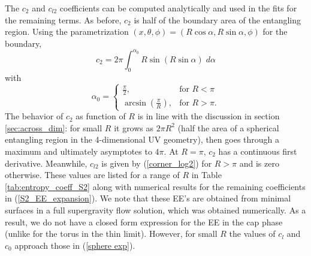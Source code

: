\documentclass[11 pt]{article}
\begin{document}
The $c_2$ and $c_{l2}$ coefficients can be computed analytically and used in the fits for the remaining terms. As before, $c_2$ is half of the boundary area of the entangling region. Using the parametrization $(x,\theta,\phi) = (R\cos{\alpha}, R\sin{\alpha},\phi)$ for the boundary,
\begin{equation}
    c_2 = 2\pi\int_0^{\alpha_0} R \sin{(R\sin{\alpha})}\; d\alpha
\end{equation}
with 
\begin{equation}
    \alpha_0 = 
    \begin{cases}
        \frac{\pi}{2}, & \text{for } R<\pi\\
        \arcsin\left(\frac{\pi}{R} \right), & \text{for } R>\pi.
    \end{cases}
\end{equation}
The behavior of $c_2$ as function of $R$ is in line with the discussion in section \ref{sec:across_dim}: for small $R$ it grows as $2\pi R^2$ (half the area of a spherical entangling region in the 4-dimensional UV geometry), then goes through a maximum and ultimately asymptotes to $4\pi$. At $R=\pi$, $c_2$ has a continuous first derivative.
Meanwhile, $c_{l2}$ is given by (\ref{corner_log2}) for $R>\pi$ and is zero otherwise. These values are listed for a range of $R$ in Table \ref{tab:entropy_coeff_S2} along with numerical results for the remaining coefficients in (\ref{S2_EE_expansion}).
We note that these EE's are obtained from minimal surfaces in a full supergravity flow solution, which was obtained numerically. As a result, we do not have a closed form expression for the EE in the cap phase (unlike for the torus in the thin limit). However, for small $R$ the values of $c_l$ and $c_0$ approach those in (\ref{sphere exp}).
\end{document}
